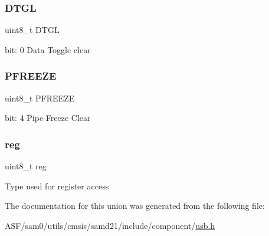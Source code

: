 \subsubsection{\texorpdfstring{DTGL}{DTGL}}
{\footnotesize\ttfamily uint8\+\_\+t D\+T\+GL}

bit\+: 0 Data Toggle clear \mbox{\label{union_u_s_b___h_o_s_t___p_s_t_a_t_u_s_c_l_r___type_a5e5a7a11855be531dd9c6eddc438572e}} 
\subsubsection{\texorpdfstring{PFREEZE}{PFREEZE}}
{\footnotesize\ttfamily uint8\+\_\+t P\+F\+R\+E\+E\+ZE}

bit\+: 4 Pipe Freeze Clear \mbox{\label{union_u_s_b___h_o_s_t___p_s_t_a_t_u_s_c_l_r___type_a9428adc9af4653a2050e2536b55dec8d}} 
\subsubsection{\texorpdfstring{reg}{reg}}
{\footnotesize\ttfamily uint8\+\_\+t reg}

Type used for register access 

The documentation for this union was generated from the following file\+:\begin{DoxyCompactItemize}
\item 
A\+S\+F/sam0/utils/cmsis/samd21/include/component/\mbox{\hyperlink{component_2usb_8h}{usb.\+h}}\end{DoxyCompactItemize}
